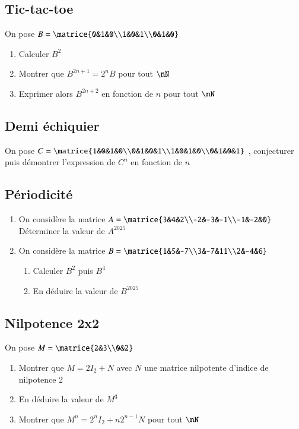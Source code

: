 \documentclass[oneside,12pt]{article}          %
\begin{document}
\subsection{Tic-tac-toe}
On pose $B=\matrice{0&1&0\\1&0&1\\0&1&0} $
    \begin{enumerate}
        \item Calculer $B^2$
        \item Montrer que $B^{2n+1}=2^nB$ pour tout $\nN$
        \item Exprimer alors $B^{2n+2}$ en fonction de $n$ pour tout $\nN$
    \end{enumerate}



\subsection{Demi échiquier}

On pose $C=\matrice{1&0&1&0\\0&1&0&1\\1&0&1&0\\0&1&0&1} $ , conjecturer puis démontrer l'expression de $C^n$ en fonction de $n$



\subsection{Périodicité}
\begin{enumerate}
    \item On considère la matrice $A=\matrice{3&4&2\\-2&-3&-1\\-1&-2&0} $ \\
    Déterminer la valeur de $A^{2025}$
    \item On considère la matrice $B=\matrice{1&5&-7\\3&-7&11\\2&-4&6}$ 
    \begin{enumerate}
    	\item Calculer $B^2$ puis $B^4$
    	\item En déduire la valeur de $B^{2025}$
    \end{enumerate}
    
\end{enumerate}



\subsection{Nilpotence 2x2}
On pose $M=\matrice{2&3\\0&2} $
    \begin{enumerate}
        \item Montrer que $M=2I_2+N$ avec $N$ une matrice nilpotente d'indice de nilpotence 2
        \item En déduire la valeur de $M^3$
        \item Montrer que $M^n=2^nI_2+n2^{n-1}N$ pour tout $\nN$
    \end{enumerate}
    
\end{document}
